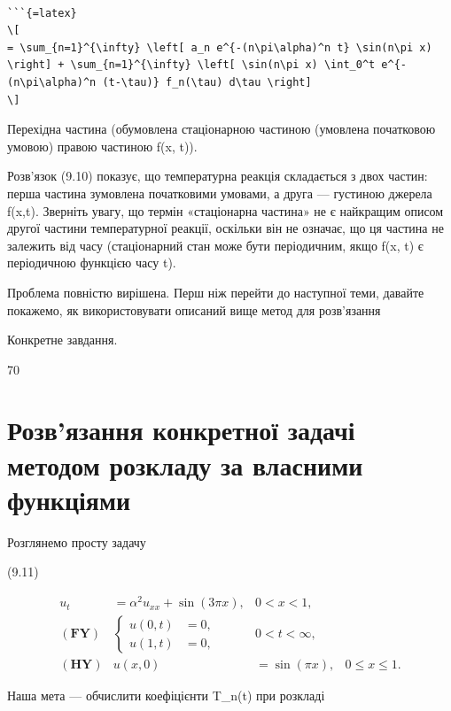 \documentclass[
]{article}
\begin{document}
\begin{verbatim}

```{=latex}
\[
= \sum_{n=1}^{\infty} \left[ a_n e^{-(n\pi\alpha)^n t} \sin(n\pi x) \right] + \sum_{n=1}^{\infty} \left[ \sin(n\pi x) \int_0^t e^{-(n\pi\alpha)^n (t-\tau)} f_n(\tau) d\tau \right]
\]
\end{verbatim}

Перехідна частина (обумовлена стаціонарною частиною (умовлена початковою
умовою) правою частиною f(x, t)).

Розв'язок (9.10) показує, що температурна реакція складається з двох
частин: перша частина зумовлена початковими умовами, а друга ---
густиною джерела f(x,t). Зверніть увагу, що термін «стаціонарна частина»
не є найкращим описом другої частини температурної реакції, оскільки він
не означає, що ця частина не залежить від часу (стаціонарний стан може
бути періодичним, якщо f(x, t) є періодичною функцією часу t).

Проблема повністю вирішена. Перш ніж перейти до наступної теми, давайте
покажемо, як використовувати описаний вище метод для розв'язання

Конкретне завдання.

70

\section{Розв'язання конкретної задачі методом розкладу за власними
функціями}\label{ux440ux43eux437ux432ux44fux437ux430ux43dux43dux44f-ux43aux43eux43dux43aux440ux435ux442ux43dux43eux457-ux437ux430ux434ux430ux447ux456-ux43cux435ux442ux43eux434ux43eux43c-ux440ux43eux437ux43aux43bux430ux434ux443-ux437ux430-ux432ux43bux430ux441ux43dux438ux43cux438-ux444ux443ux43dux43aux446ux456ux44fux43cux438}

Розглянемо просту задачу

(9.11)

\[
\begin{aligned} u_t &= \alpha^2 u_{xx} + \sin{(3\pi x)}, & 0 < x < 1, \\ (\mathbf{FY}) & \begin{cases} u(0, t) &= 0, \\ u(1, t) &= 0, \end{cases} & 0 < t < \infty, \\ (\mathbf{HY}) & u(x, 0) &= \sin{(\pi x)}, & 0 \leq x \leq 1. \end{aligned}
\]

Наша мета --- обчислити коефіцієнти T\_n(t) при розкладі
\end{document}
